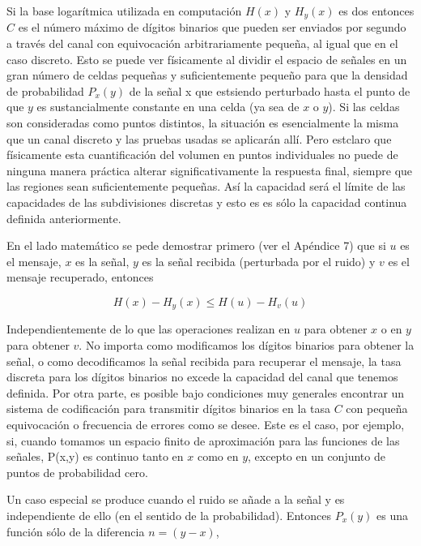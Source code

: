 	Si la base logar\'itmica utilizada en computaci\'on $H(x)$ y $H_{y}(x)$ es dos 
	entonces $C$ es el n\'umero m\'aximo de d\'igitos binarios que pueden ser enviados
	por segundo a trav\'es del canal con equivocaci\'on arbitrariamente peque\~na,
	al igual que en el caso discreto. Esto se puede ver f\'isicamente al dividir el espacio
	de se\~nales en un gran n\'umero de celdas peque\~nas y suficientemente peque\~no
	para que la densidad de probabilidad $P_{x}(y)$ de la se\~nal x que est\á siendo
	perturbado hasta el punto de que $y$ es sustancialmente constante en una celda
	(ya sea de $x$ o $y$). Si las celdas son consideradas como puntos distintos, la 
	situaci\'on es esencialmente la misma que un canal discreto y las pruebas usadas
	se aplicar\'an allí. Pero est\á claro que f\'isicamente esta cuantificaci\'on del 
	volumen en puntos individuales no puede de ninguna manera pr\'actica alterar 
	significativamente la respuesta final, siempre que las regiones sean suficientemente
	peque\~nas. As\'i la capacidad será el l\'imite de las capacidades de las 
	subdivisiones discretas y esto es es s\'olo la capacidad continua definida anteriormente.
	
	En el lado matem\'atico se pede demostrar primero (ver el Ap\'endice 7) que si $u$
	es el mensaje, $x$ es la se\~nal, $y$ es la se\~nal recibida (perturbada por el ruido)
	y $v$ es el mensaje recuperado, entonces
	
	\begin{equation}
		H(x) - H_{y}(x) \le H(u) - H_{v}(u)
	\end{equation}	 
	
	Independientemente de lo que las operaciones realizan en $u$ para obtener $x$ o en $y$
	para obtener $v$. No importa como modificamos los d\'igitos binarios para obtener la
	se\~nal, o como decodificamos la se\~nal recibida para recuperar el mensaje, la tasa
	discreta para los d\'igitos binarios no excede la capacidad del canal que tenemos
	definida. Por otra parte, es posible bajo condiciones muy generales encontrar un 
	sistema de codificaci\'on para transmitir d\'igitos binarios en la tasa $C$ con peque\~na
	equivocaci\'on o frecuencia de errores como se desee. Este es el caso, por ejemplo, 
	si, cuando tomamos un espacio finito de aproximaci\'on para las funciones de 
	las se\~nales, P(x,y) es continuo tanto en $x$ como en $y$, excepto en un conjunto
	de puntos de probabilidad cero.
	
	Un caso especial se produce cuando el ruido se a\~nade a la se\~nal y es 
	independiente de ello (en el sentido de la probabilidad). Entonces $P_{x}(y)$
	es una funci\'on s\'olo de la diferencia $n = (y-x)$,
	
